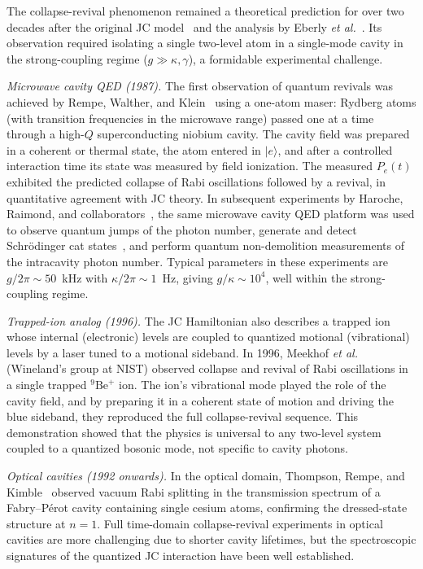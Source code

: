 \documentclass[12pt]{iopart}
\begin{document}
The collapse-revival phenomenon remained a theoretical prediction for over two decades after the original JC model~\cite{jaynes1963} and the analysis by Eberly \textit{et al.}~\cite{eberly1980}. Its observation required isolating a single two-level atom in a single-mode cavity in the strong-coupling regime ($g \gg \kappa, \gamma$), a formidable experimental challenge.

\textit{Microwave cavity QED (1987).} The first observation of quantum revivals was achieved by Rempe, Walther, and Klein~\cite{rempe1987} using a one-atom maser: Rydberg atoms (with transition frequencies in the microwave range) passed one at a time through a high-$Q$ superconducting niobium cavity. The cavity field was prepared in a coherent or thermal state, the atom entered in $|e\rangle$, and after a controlled interaction time its state was measured by field ionization. The measured $P_e(t)$ exhibited the predicted collapse of Rabi oscillations followed by a revival, in quantitative agreement with JC theory. In subsequent experiments by Haroche, Raimond, and collaborators~\cite{haroche2006}, the same microwave cavity QED platform was used to observe quantum jumps of the photon number, generate and detect Schr\"{o}dinger cat states~\cite{brune1996}, and perform quantum non-demolition measurements of the intracavity photon number. Typical parameters in these experiments are $g/2\pi \sim 50$~kHz with $\kappa/2\pi \sim 1$~Hz, giving $g/\kappa \sim 10^4$, well within the strong-coupling regime.

\textit{Trapped-ion analog (1996).} The JC Hamiltonian also describes a trapped ion whose internal (electronic) levels are coupled to quantized motional (vibrational) levels by a laser tuned to a motional sideband. In 1996, Meekhof \textit{et al.}~\cite{meekhof1996} (Wineland's group at NIST) observed collapse and revival of Rabi oscillations in a single trapped $^9\text{Be}^+$ ion. The ion's vibrational mode played the role of the cavity field, and by preparing it in a coherent state of motion and driving the blue sideband, they reproduced the full collapse-revival sequence. This demonstration showed that the physics is universal to any two-level system coupled to a quantized bosonic mode, not specific to cavity photons.

\textit{Optical cavities (1992 onwards).} In the optical domain, Thompson, Rempe, and Kimble~\cite{thompson1992} observed vacuum Rabi splitting in the transmission spectrum of a Fabry--P\'{e}rot cavity containing single cesium atoms, confirming the dressed-state structure at $n = 1$. Full time-domain collapse-revival experiments in optical cavities are more challenging due to shorter cavity lifetimes, but the spectroscopic signatures of the quantized JC interaction have been well established.
\end{document}
